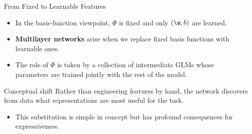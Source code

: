 \begin{frame}{From Fixed to Learnable Features}
  \begin{itemize}
    \item In the basis-function viewpoint, $\Phi$ is fixed and only $(\w, b)$ are learned.
    \item \textbf{Multilayer networks} arise when we \alert{replace fixed basis functions with learnable ones}.
    \item The role of $\Phi$ is taken by a collection of intermediate GLMs whose parameters are \alert{trained jointly} with the rest of the model.
  \end{itemize}
  \begin{block}{Conceptual shift}
    Rather than engineering features by hand, the network \alert{discovers} from data what
    representations are most useful for the task.
  \end{block}
  \begin{itemize}
    \item This substitution is simple in concept but has \alert{profound consequences} for expressiveness.
  \end{itemize}
\end{frame}

